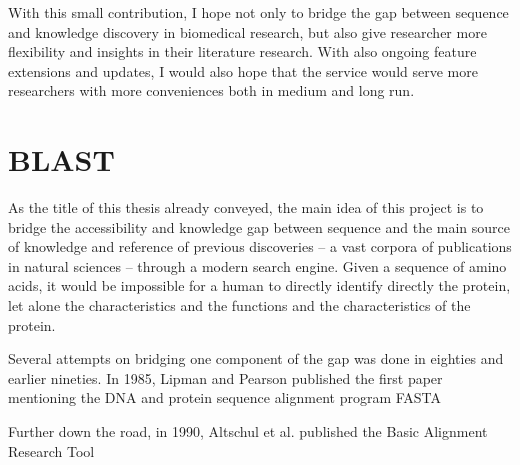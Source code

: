 With this small contribution, I hope not only to bridge the gap between sequence and knowledge discovery in biomedical research, but also give researcher more flexibility and insights in their literature research. With also ongoing feature extensions and updates, I would also hope that the service would serve more researchers with more conveniences both in medium and long run.

\section{BLAST}

As the title of this thesis already conveyed, the main idea of this project is to bridge the accessibility and knowledge gap between sequence and the main source of knowledge and reference of previous discoveries -- a vast corpora of publications in natural sciences -- through a modern search engine. Given a sequence of amino acids, it would be impossible for a human to directly identify directly the protein, let alone the characteristics and the functions and the characteristics of the protein.

Several attempts on bridging one component of the gap was done in eighties and earlier nineties. In 1985, Lipman and Pearson published the first paper mentioning the DNA and protein sequence alignment program FASTA \citep{Lipman85}

Further down the road, in 1990, Altschul et al. published the Basic Alignment Research Tool \citep{Altschul90}

